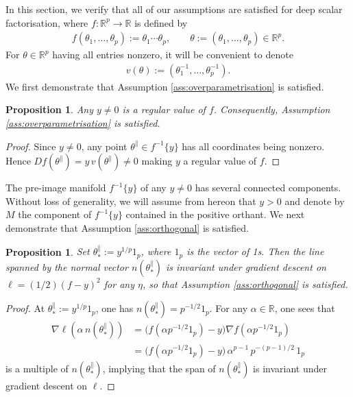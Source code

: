 \documentclass{article}
\newcommand{\RB}{\mathbb{R}}
\newcommand{\tpa}{\theta^{\parallel}}
\theoremstyle{plain}
\newtheorem{proposition}[theorem]{Proposition}
\theoremstyle{definition}
\theoremstyle{remark}
\begin{document}
In this section, we verify that all of our assumptions are satisfied for deep scalar factorisation, where $f:\RB^p\rightarrow\RB$ is defined by
\begin{align}
    f(\theta_1,\dots,\theta_p):=\theta_1\cdots\theta_p,\qquad \theta:=(\theta_1,\dots,\theta_p)\in\RB^p.
\end{align}
For $\theta\in\RB^p$ having all entries nonzero, it will be convenient to denote
\begin{align}
    v(\theta):=(\theta_1^{-1},\dots,\theta_p^{-1}).\label{eq:v}
\end{align}
We first demonstrate that Assumption \ref{ass:overparametrisation} is satisfied.

\begin{proposition}\label{prop:overparametrisation}
    Any $y\neq 0$ is a regular value of $f$. Consequently, Assumption \ref{ass:overparametrisation} is satisfied.
\end{proposition}

\begin{proof}
    Since $y\neq 0$, any point $\tpa\in f^{-1}\{y\}$ has all coordinates being nonzero. Hence $Df(\tpa) = y\, v(\tpa)\neq 0$ making $y$ a regular value of $f$.
\end{proof}

The pre-image manifold $f^{-1}\{y\}$ of any $y\neq 0$ has several connected components. Without loss of generality, we will assume from hereon that $y>0$ and denote by $M$ the component of $f^{-1}\{y\}$ contained in the positive orthant. We next demonstrate that Assumption \ref{ass:orthogonal} is satisfied.

\begin{proposition}\label{prop:orthogonal}
    Set $\tpa_*:=y^{1/p}1_p$, where $1_p$ is the vector of 1s. Then the line spanned by the normal vector $n(\tpa_*)$ is invariant under gradient descent on $\ell = (1/2)(f-y)^2$ for any $\eta$, so that Assumption \ref{ass:orthogonal} is satisfied.
\end{proposition}

\begin{proof}
    At $\tpa_*:=y^{1/p}1_p$, one has $n(\tpa_*) = p^{-1/2}1_p$. For any $\alpha\in\RB$, one sees that
    \begin{align}
        \nabla\ell(\alpha\,n(\tpa_*)) &= \big(f(\alpha p^{-1/2}1_p)-y\big)\nabla f(\alpha p^{-1/2}1_p)\\&=\big(f(\alpha p^{-1/2}1_p)-y\big)\,\alpha^{p-1}\,p^{-(p-1)/2}\,1_p
    \end{align}
    is a multiple of $n(\tpa_*)$, implying that the span of $n(\tpa_*)$ is invariant under gradient descent on $\ell$.
\end{proof}
\end{document}
